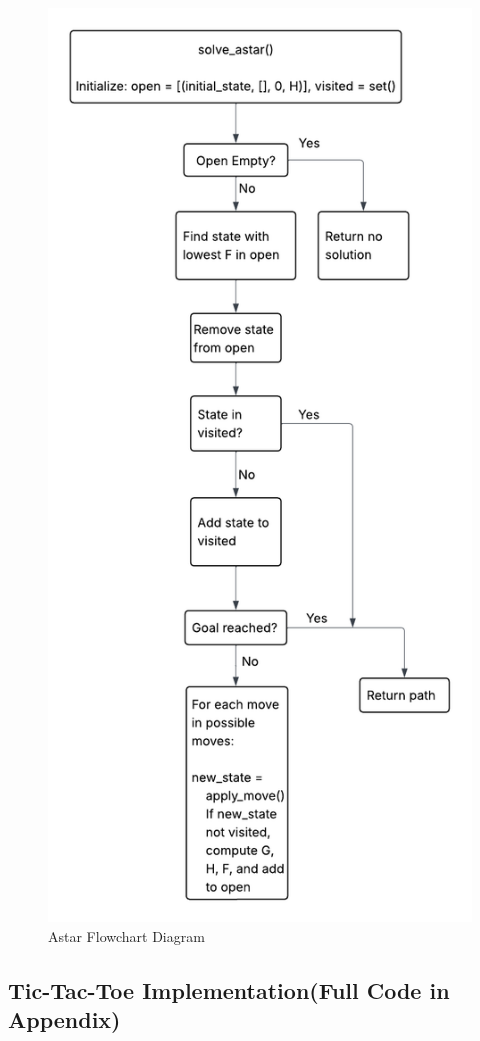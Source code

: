 \documentclass[journal]{./IEEE/IEEEtran}
\begin{document}
\begin{itemize}
  \begin{figure}[H]
    \centering
    \includegraphics[width=0.6\linewidth]{pictures-Clarence/astar flowchart.png}
    \caption{Astar Flowchart Diagram}
    \label{fig:astar_flowchart}
  \end{figure}

\end{itemize}

\subsection{Tic-Tac-Toe Implementation(Full Code in Appendix)}
\end{document}
